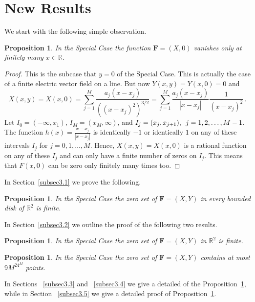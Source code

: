 \documentclass{article}
\newtheorem{prop}[thm]{Proposition}
\theoremstyle{remark}
\numberwithin{equation}{section}
\begin{document}
\section{New Results}\label{NewResults}

We start with the following simple observation.

\begin{prop} 
In the Special Case the function ${\mathbf F}=(X,0)$ vanishes only at finitely many $x \in {\mathbb R}$.
\end{prop}  

\begin{proof}
This is the subcase that $y = 0$ of the Special Case. This is actually the case of a finite electric vector field on a line.  But now $Y(x,y) = Y(x,0) = 0$ and 
$$X(x,y) = X(x,0) = \sum_{j=1}^M{\frac{a_j(x-x_j)}{\left( (x-x_j)^2 \right)^{3/2}}} = \sum_{j=1}^M{\frac{a_j(x-x_j)}{|x-x_j|} \frac{1}{(x-x_j)^2}}\,.$$
Let $I_0 = (-\infty,x_1)$, $I_M = (x_M,\infty)$, and $I_j = (x_j,x_{j+1}), \enskip j=1,2,\ldots,M-1$.
The function $h(x) = \displaystyle{\frac{x-x_j}{|x-x_j|}}$ is identically $-1$ or identically $1$ on any of these intervals $I_j$ for $j=0,1,\ldots,M$.
Hence, $X(x,y) = X(x,0)$ is a rational function on any of these $I_j$ and can only have a finite number of zeros on $I_j$. This means that $F(x,0)$
can be zero only finitely many times too.
\end{proof}

In Section~\ref{subsec3.1} we prove the following.

\begin{prop}\label{XXX} In the Special Case the zero set of ${\mathbf F}=(X,Y)$ in every bounded disk of ${\mathbb R}^2$ is finite.
\end{prop}

In Section~\ref{subsec3.2} we outline the proof of the following two results. 

\begin{prop}\label{FINITE} In the Special Case the zero set of ${\mathbf F}=(X,Y)$ in ${\mathbb R}^2$ is finite.
\end{prop}

\begin{prop}\label{UPPERBOUND} In the Special Case the zero set of ${\mathbf F}=(X,Y)$ contains at most $9M^24^M$ points.
\end{prop}

In Sections ~\ref{subsec3.3} and ~\ref{subsec3.4} we give a detailed of the Proposition~\ref{FINITE}, while in Section ~\ref{subsec3.5} we give a detailed proof 
of Proposition~\ref{UPPERBOUND}.
\end{document}

